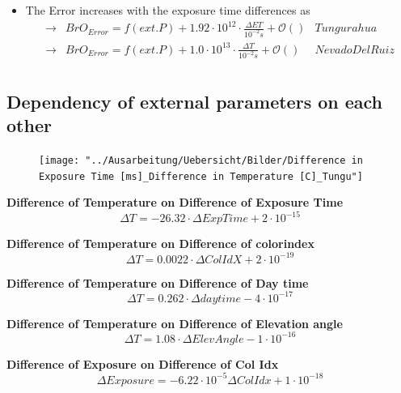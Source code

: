 \documentclass  [
  paper    = a4,
  BCOR     = 10mm,
  twoside,
  fontsize = 12pt,
  fleqn,
  toc      = bibnumbered,
  toc      = listofnumbered,
  numbers  = noendperiod,
  headings = normal,
  listof   = leveldown,
  version  = 3.03
]                                       {scrreprt}
\begin{document}
	\begin{itemize}
		\item The  Error increases with the exposure time differences as\\
		\begin{align*}
		\rightarrow&  BrO_{Error} = f(ext. P)+ 1.92\cdot10^{12}\cdot\frac{\Delta ET}{10^{-2}s} + \mathcal{O}\left(\right) & Tungurahua\\
		\rightarrow&  BrO_{Error} = f(ext. P)+ 1.0\cdot10^{13}\cdot\frac{\Delta T}{10^{-2}s} + \mathcal{O}\left(\right) & Nevado Del Ruiz\\
		\end{align*}
	\end{itemize}
	\subsection*{Dependency of external parameters on each other}
	\begin{figure}
		\centering
		\texttt{[image: "../Ausarbeitung/Uebersicht/Bilder/Difference in Exposure Time [ms]\_Difference in Temperature [C]\_Tungu"]}
		\caption{}
		\label{fig:difference-in-exposure-time-msdifference-in-temperature-ctungu}
	\end{figure}
	
		\textbf{Difference of Temperature on  Difference of Exposure Time}
		\begin{equation}
		\Delta T =  -26.32\cdot \Delta ExpTime + 2\cdot 10^{-15}
		\end{equation}
		
		\textbf{Difference of Temperature on  Difference of colorindex}
		\begin{equation}
		\Delta T = 0.0022\cdot \Delta ColIdX +2\cdot 10^{-19}
		\end{equation}
		
				\textbf{Difference of Temperature on  Difference of Day time}
		\begin{equation}
		\Delta T =0.262\cdot \Delta daytime -4\cdot 10^{-17}
		\end{equation}
		
						\textbf{Difference of Temperature on  Difference of Elevation angle}
		\begin{equation}
		\Delta T =1.08\cdot \Delta Elev Angle -1\cdot 10^{-16}
		\end{equation}

		\textbf{Difference of Exposure on  Difference of  Col Idx}
		\begin{equation}
		\Delta Exposure  =-6.22\cdot 10^{-5} \Delta Col Idx  +1\cdot 10^{-18}
		\end{equation}
		
\end{document}
